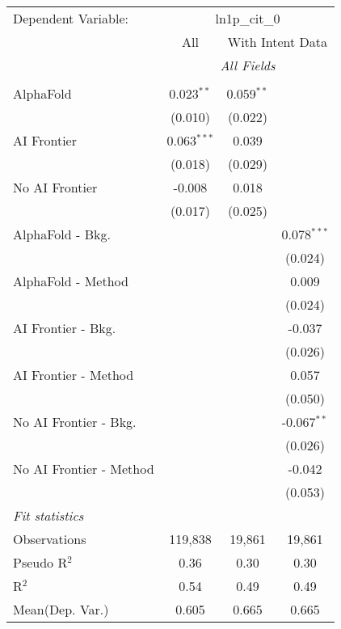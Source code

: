 \begingroup
\centering
\begin{tabular}{lccc}
   \tabularnewline \midrule \midrule
   Dependent Variable: & \multicolumn{3}{c}{ln1p\_cit\_0}\\
 & \multicolumn{1}{c}{All} & \multicolumn{2}{c}{With Intent Data} \\
\cmidrule(lr){2-2} \cmidrule(lr){3-4}
 & \multicolumn{3}{c}{\textit{All Fields}} \\ \\
   AlphaFold               & 0.023$^{**}$  & 0.059$^{**}$ &   \\   
                           & (0.010)       & (0.022)      &   \\   
   AI Frontier             & 0.063$^{***}$ & 0.039        &   \\   
                           & (0.018)       & (0.029)      &   \\   
   No AI Frontier          & -0.008        & 0.018        &   \\   
                           & (0.017)       & (0.025)      &   \\   
   AlphaFold - Bkg.        &               &              & 0.078$^{***}$\\   
                           &               &              & (0.024)\\   
   AlphaFold - Method      &               &              & 0.009\\   
                           &               &              & (0.024)\\   
   AI Frontier - Bkg.      &               &              & -0.037\\   
                           &               &              & (0.026)\\   
   AI Frontier - Method    &               &              & 0.057\\   
                           &               &              & (0.050)\\   
   No AI Frontier - Bkg.   &               &              & -0.067$^{**}$\\   
                           &               &              & (0.026)\\   
   No AI Frontier - Method &               &              & -0.042\\   
                           &               &              & (0.053)\\   
   \midrule
   \emph{Fit statistics}\\
   Observations            & 119,838       & 19,861       & 19,861\\  
   Pseudo R$^2$            & 0.36          & 0.30         & 0.30\\  
   R$^2$                   & 0.54          & 0.49         & 0.49\\  
Mean(Dep. Var.) & 0.605 & 0.665 & 0.665 \\
   

\end{tabular}

